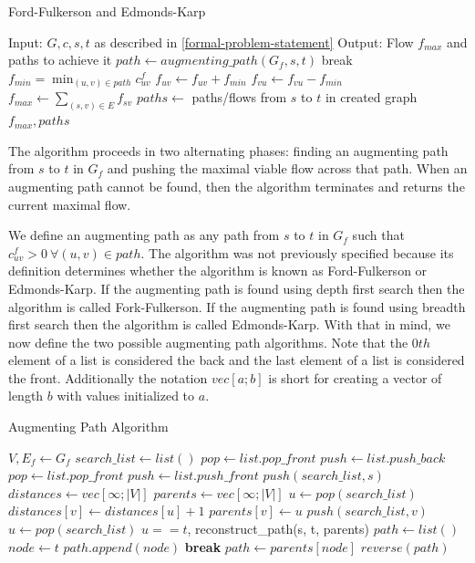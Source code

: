 \documentclass{article}
\begin{document}
\begin{algorithm}
\label{ff-ek-algorithm}
\caption{Ford-Fulkerson and Edmonds-Karp}
\begin{algorithmic}[1]
\State Input: $G,c,s,t$ as described in \ref{formal-problem-statement}
\State Output: Flow $f_{max}$ and paths to achieve it
\Loop
\State $path\gets augmenting\_path(G_f,s,t)$
\State break
\EndIf
\State $f_{min}=\min_{(u,v)\in path} c^f_{uv}$
\State $f_{uv}\gets f_{uv}+f_{min}$
\State $f_{vu}\gets f_{vu}-f_{min}$
\EndFor
\EndLoop
\State $f_{max}\gets \sum_{(s,v)\in E}f_{sv}$
\State $paths\gets$ paths/flows from $s$ to $t$ in created graph
\State \Return $f_{max},paths$
\EndFunction
\end{algorithmic}
\end{algorithm}

The algorithm proceeds in two alternating phases: finding an augmenting path from $s$ to $t$ in $G_f$ and pushing the maximal viable flow across that path. When an augmenting path cannot be found, then the algorithm terminates and returns the current maximal flow.

We define an augmenting path as any path from $s$ to $t$ in $G_f$ such that $c^f_{uv}>0\ \forall (u,v)\in path$. The algorithm was not previously specified because its definition determines whether the algorithm is known as Ford-Fulkerson or Edmonds-Karp. If the augmenting path is found using depth first search then the algorithm is called Fork-Fulkerson. If the augmenting path is found using breadth first search then the algorithm is called Edmonds-Karp. With that in mind, we now define the two possible augmenting path algorithms. Note that the $0th$ element of a list is considered the back and the last element of a list is considered the front. Additionally the notation $vec[a;b]$ is short for creating a vector of length $b$ with values initialized to $a$.

\begin{algorithm}
\label{ap-algorithm}
\caption{Augmenting Path Algorithm}
\begin{algorithmic}[1]
\State $V, E_f\gets G_f$
\State $search\_list \gets list()$
\State $pop \gets list.pop\_front$
\State $push \gets list.push\_back$
\Else
\State $pop \gets list.pop\_front$
\State $push \gets list.push\_front$
\EndIf
\State $push(search\_list, s)$
\State $distances\gets vec[\infty; |V|]$
\State $parents\gets vec[\infty; |V|]$
\State $u\gets pop(search\_list)$
\State $distances[v]\gets distances[u] + 1$
\State $parents[v]\gets u$
\State $push(search\_list, v)$
\EndIf
\EndFor
\State $u\gets pop(search\_list)$
\EndWhile
\State\Return $u == t$, reconstruct\_path(s, t, parents)
\EndFunction
\Statex
{}
\State $path\gets list()$
\State $node\gets t$
\Loop
\State $path.append(node)$
\State \textbf{break}
\EndIf
\State $path\gets parents[node]$
\EndLoop
\State\Return $reverse(path)$
\EndFunction
\end{algorithmic}
\end{algorithm}
\end{document}
